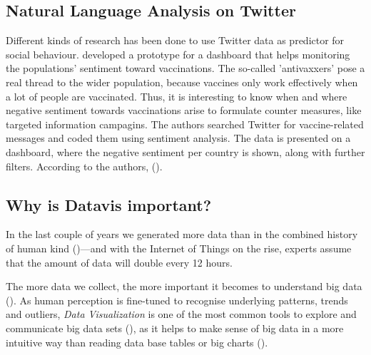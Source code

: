 \subsection{Natural Language Analysis on Twitter}

Different kinds of research has been done to use Twitter data as predictor for social behaviour. \citeauthor{bahk2016publicly} developed a prototype for a dashboard that helps monitoring the populations' sentiment toward vaccinations. The so-called 'antivaxxers' pose a real thread to the wider population, because vaccines only work effectively when a lot of people are vaccinated. Thus, it is interesting to know when and where negative sentiment towards vaccinations arise to formulate counter measures, like targeted information campagins. The authors searched Twitter for vaccine-related messages and coded them using sentiment analysis. The data is presented on a dashboard, where the negative sentiment per country is shown, along with further filters. According to the authors,  (\cite[343]{bahk2016publicly}). 


\subsection{Why is Datavis important?}


In the last couple of years we generated more data than in the combined history of human kind (\cite{helbing2019will})---and with the Internet of Things on the rise, experts assume that the amount of data will double every 12 hours.

The more data we collect, %
the more important it becomes to understand big data (\cite{borner_data_2019}). As human perception is fine-tuned to recognise underlying patterns, trends and outliers, \emph{Data Visualization} is one of the most common tools to explore and communicate big data sets (\cite{heer_tour_2010}), as it helps to make sense of big data in a more intuitive way than reading data base tables or big charts (\cite{donalek_immersive_2014}).


